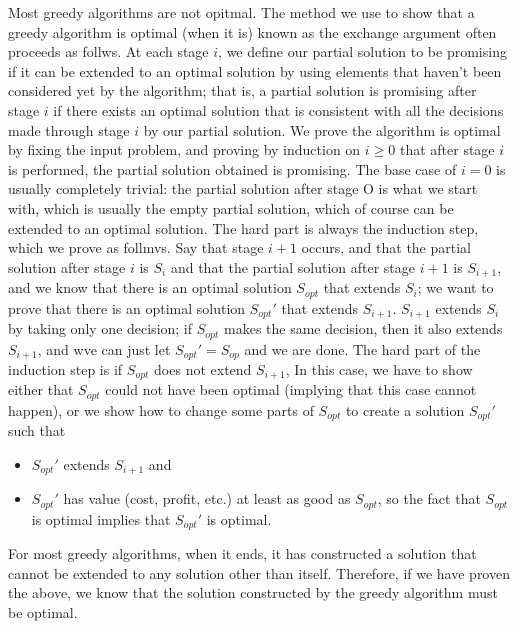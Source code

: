 Most greedy algorithms are not opitmal. The method we use to show that a greedy algorithm is optimal (when it is) known as the exchange argument often proceeds as follws. At each stage $i$, we define our partial solution to be promising if it can be extended to an optimal solution by using elements that haven't been considered yet by the algorithm; that is, a partial solution is promising after stage $i$ if there exists an optimal solution that is consistent with all the decisions made through stage $i$ by our partial solution. We prove the algorithm is optimal by fixing the input problem, and proving by induction on $i \geq 0$ that after stage $i$ is performed, the partial solution obtained is promising. The base case of $i=0$ is usually completely trivial: the partial solution after stage O is what we start with, which is usually the empty partial solution, which of course can be extended to an optimal solution. The hard part is always the induction step, which we prove as follmvs. Say that stage $i+1$ occurs, and that the partial solution after stage $i$ is $S_i$ and that the partial solution after stage $i+1$ is $S_{i+1}$, and we know that there is an optimal solution $S_{opt}$ that extends $S_i$; we want to prove that there is an optimal solution $S_{opt}'$ that extends $S_{i+1}$. $S_{i+1}$ extends $S_i$ by taking only one decision; if $S_{opt}$ makes the same decision, then it also extends $S_{i+1}$, and wve can just let $S_{opt}' = S_{op}$ and we are done. The hard part of the induction step is if $S_{opt}$ does not extend $S_{i+1}$, In this case, we have to show either that $S_{opt}$ could not have been optimal (implying that this case cannot happen), or we show how to change some parts of $S_{opt}$ to create a solution $S_{opt}'$ such that

\begin{itemize}
    \item $S_{opt}'$ extends $S_{i+1}$ and
    \item $S_{opt}'$ has value (cost, profit, etc.) at least as good as $S_{opt}$, so the fact that $S_{opt}$ is optimal implies that $S_{opt}'$ is optimal.
\end{itemize}

For most greedy algorithms, when it ends, it has constructed a solution that cannot be extended to any solution other than itself. Therefore, if we have proven the above, we know that the solution constructed by the greedy algorithm must be optimal.